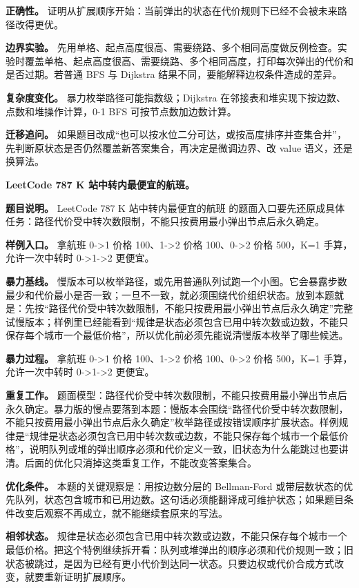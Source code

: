 \textbf{正确性。} 证明从扩展顺序开始：当前弹出的状态在代价规则下已经不会被未来路径改得更优。

\textbf{边界实验。} 先用单格、起点高度很高、需要绕路、多个相同高度做反例检查。实验时覆盖单格、起点高度很高、需要绕路、多个相同高度，打印每次弹出的代价和是否过期。若普通 BFS 与 Dijkstra 结果不同，要能解释边权条件造成的差异。

\textbf{复杂度变化。} 暴力枚举路径可能指数级；Dijkstra 在邻接表和堆实现下按边数、点数和堆操作计算，0-1 BFS 可按节点数加边数计算。

\textbf{迁移追问。} 如果题目改成“也可以按水位二分可达，或按高度排序并查集合并”，先判断原状态是否仍然覆盖新答案集合，再决定是微调边界、改 value 语义，还是换算法。

\noindent\textbf{LeetCode 787 K 站中转内最便宜的航班。}

\textbf{题目说明。} LeetCode 787 K 站中转内最便宜的航班 的题面入口要先还原成具体任务：路径代价受中转次数限制，不能只按费用最小弹出节点后永久确定。

\textbf{样例入口。} 拿航班 0->1 价格 100、1->2 价格 100、0->2 价格 500，K=1 手算，允许一次中转时 0->1->2 更便宜。

\textbf{暴力基线。} 慢版本可以枚举路径，或先用普通队列试跑一个小图。它会暴露步数最少和代价最小是否一致；一旦不一致，就必须围绕代价组织状态。放到本题就是：先按“路径代价受中转次数限制，不能只按费用最小弹出节点后永久确定”完整试慢版本；样例里已经能看到“规律是状态必须包含已用中转次数或边数，不能只保存每个城市一个最低价格”，所以优化前必须先能说清慢版本枚举了哪些候选。

\textbf{暴力过程。} 拿航班 0->1 价格 100、1->2 价格 100、0->2 价格 500，K=1 手算，允许一次中转时 0->1->2 更便宜。

\textbf{重复工作。} 题面模型：路径代价受中转次数限制，不能只按费用最小弹出节点后永久确定。暴力版的慢点要落到本题：慢版本会围绕“路径代价受中转次数限制，不能只按费用最小弹出节点后永久确定”枚举路径或按错误顺序扩展状态。样例规律是“规律是状态必须包含已用中转次数或边数，不能只保存每个城市一个最低价格”，说明队列或堆的弹出顺序必须和代价定义一致，旧状态为什么能跳过也要讲清。后面的优化只消掉这类重复工作，不能改变答案集合。

\textbf{优化条件。} 本题的关键观察是：用按边数分层的 Bellman-Ford 或带层数状态的优先队列，状态包含城市和已用边数。这句话必须能翻译成可维护状态；如果题目条件改变后观察不再成立，就不能继续套原来的写法。

\textbf{相邻状态。} 规律是状态必须包含已用中转次数或边数，不能只保存每个城市一个最低价格。把这个特例继续拆开看：队列或堆弹出的顺序必须和代价规则一致；旧状态被跳过，是因为已经有更小代价到达同一状态。只要边权或代价合成方式改变，就要重新证明扩展顺序。

